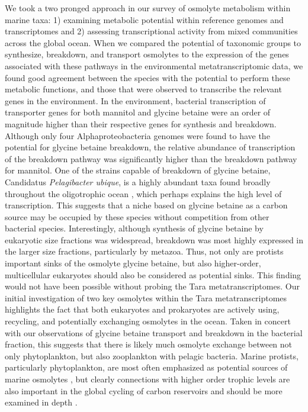 \documentclass[utf8]{frontiersSCNS} %
\begin{document}
We took a two pronged approach in our survey of osmolyte metabolism within marine taxa: 1) examining metabolic potential within reference genomes and transcriptomes and 2) assessing transcriptional activity from mixed communities across the global ocean. When we compared the potential of taxonomic groups to synthesize, breakdown, and transport osmolytes to the expression of the genes associated with these pathways in the environmental metatranscriptomic data, we found good agreement between the species with the potential to perform these metabolic functions, and those that were observed to transcribe the relevant genes in the environment. In the environment, bacterial transcription of transporter genes for both mannitol and glycine betaine were an order of magnitude higher than their respective genes for synthesis and breakdown. Although only four Alphaproteobacteria genomes were found to have the potential for glycine betaine breakdown, the relative abundance of transcription of the breakdown pathway was significantly higher than the breakdown pathway for mannitol. One of the strains capable of breakdown of glycine betaine, Candidatus \emph{Pelagibacter ubique}, is a highly abundant taxa found broadly throughout the oligotrophic ocean \citep{Morris2002}, which perhaps explains the high level of transcription. This suggests that a niche based on glycine betaine as a carbon source may be occupied by these species without competition from other bacterial species. Interestingly, although synthesis of glycine betaine by eukaryotic size fractions was widespread, breakdown was most highly expressed in the larger size fractions, particularly by metazoa. Thus, not only are protists important sinks of the osmolyte glycine betaine, but also higher-order, multicellular eukaryotes should also be considered as potential sinks. This finding  would not have been possible without probing the Tara metatranscriptomes. Our initial investigation of two key osmolytes within the Tara metatranscriptomes highlights the fact that both eukaryotes and prokaryotes are actively using, recycling, and potentially exchanging osmolytes in the ocean. Taken in concert with our observations of glycine betaine transport and breakdown in the bacterial fraction, this suggests that there is likely much osmolyte exchange between not only phytoplankton, but also zooplankton with pelagic bacteria. Marine protists, particularly phytoplankton, are most often emphasized as potential sources of marine osmolytes \citep{Durham2019}, but clearly connections with higher order trophic levels are also important in the global cycling of carbon reservoirs and should be more examined in depth \citep{Clifford2020}.
\end{document}
